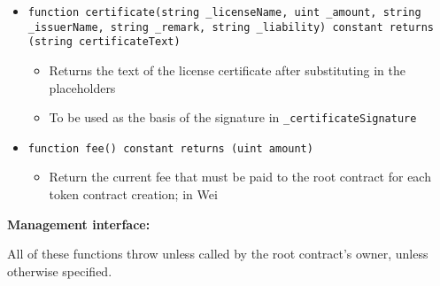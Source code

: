 \documentclass[a4paper]{article}
\begin{document}
\begin{itemize}
  \item \texttt{function certificate(string \_licenseName, uint \_amount, string \_issuerName, string \_remark, string \_liability) constant returns (string certificateText)}
  \begin{itemize}
    \item Returns the text of the license certificate after substituting in the placeholders
    \item To be used as the basis of the signature in \texttt{\_certificateSignature}
  \end{itemize}
  
  \item \texttt{function fee() constant returns (uint amount)}
  \begin{itemize}
    \item Return the current fee that must be paid to the root contract for each token contract creation; in Wei
  \end{itemize}
\end{itemize}

\textbf{Management interface:}

All of these functions throw unless called by the root contract's owner, unless otherwise specified.
\end{document}

